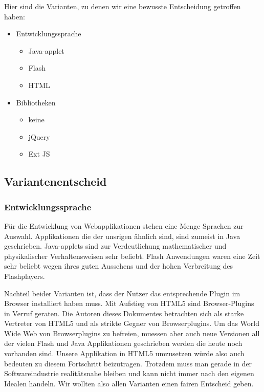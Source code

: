 \documentclass[11pt,paper=a4,final]{scrartcl}
\begin{document}
Hier sind die Varianten, zu denen wir eine bewusste Entscheidung getroffen
haben:
\begin{itemize}
  \item Entwicklungssprache
  \begin{itemize}
    \item Java-applet
    \item Flash
    \item HTML
  \end{itemize}
  \item Bibliotheken
  \begin{itemize}
    \item keine
    \item jQuery
    \item Ext JS
  \end{itemize}
\end{itemize}
\subsection{Variantenentscheid}
\subsubsection{Entwicklungssprache}
F\"ur die Entwicklung von Webapplikationen stehen eine Menge Sprachen zur
Auswahl. Applikationen die der unsrigen \"ahnlich sind, sind zumeist in Java
geschrieben. Java-applets sind zur Verdeutlichung mathematischer und
physikalischer Verhaltensweisen sehr beliebt. Flash Anwendungen waren eine Zeit
sehr beliebt wegen ihres guten Aussehens und der hohen Verbreitung des
Flashplayers.

Nachteil beider Varianten ist, dass der Nutzer das entsprechende Plugin im
Browser installiert haben muss. Mit Aufstieg von HTML5 sind Browser-Plugins in
Verruf geraten.
Die Autoren dieses Dokumentes betrachten sich als starke Vertreter von HTML5 und
als strikte Gegner von Browserplugins. Um das World Wide Web von Browserplugins
zu befreien, muessen aber auch neue Versionen all der vielen Flash und Java
Applikationen geschrieben werden die heute noch vorhanden sind. Unsere
Applikation in HTML5 umzusetzen w\"urde also auch bedeuten zu diesem Fortschritt
beizutragen. Trotzdem muss man gerade in der Softwareindustrie realit\"atsnahe
bleiben und kann nicht immer nach den eigenen Idealen handeln. Wir wollten also
allen Varianten einen fairen Entscheid geben.
\end{document}
